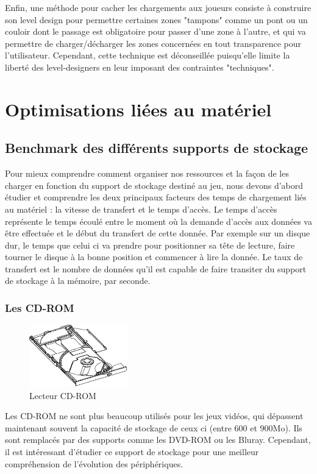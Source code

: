 \documentclass[a4paper, 11pt]{article} %
\begin{document}
Enfin, une méthode pour cacher les chargements aux joueurs consiste à construire son level design pour permettre certaines zones "tampons" comme un pont ou un couloir dont le passage est obligatoire pour passer d'une zone à l'autre, et qui va permettre de charger/décharger les zones concernées en tout transparence pour l'utilisateur. Cependant, cette technique est déconseillée puisqu'elle limite la liberté des level-designers en leur imposant des contraintes "techniques".

\newpage
\section{Optimisations liées au matériel}
\subsection{Benchmark des différents supports de stockage}
Pour mieux comprendre comment organiser nos ressources et la façon de les charger en fonction du support de stockage destiné au jeu, nous devons d'abord étudier et comprendre les deux principaux facteurs des temps de chargement liés au matériel : la vitesse de transfert et le temps d'accès. Le temps d'accès représente le temps écoulé entre le moment où la demande d'accès aux données va être effectuée et le début du transfert de cette donnée. Par exemple sur un disque dur, le temps que celui ci va prendre pour positionner sa tête de lecture, faire tourner le disque à la bonne position et commencer à lire la donnée. Le taux de transfert est le nombre de données qu'il est capable de faire transiter du support de stockage à la mémoire, par seconde.

\subsubsection{Les CD-ROM}
\begin{figure}
\begin{center}
\includegraphics[width=0.38\textwidth]{images/cdrom.png}
\end{center}
\caption{Lecteur CD-ROM}
\end{figure}
Les CD-ROM ne sont plus beaucoup utilisés pour les jeux vidéos, qui dépassent maintenant souvent la capacité de stockage de ceux ci (entre 600 et 900Mo). Ils sont remplacés par des supports comme les DVD-ROM ou les Bluray. Cependant, il est intéressant d'étudier ce support de stockage pour une meilleur compréhension de l'évolution des périphériques.
\end{document}
